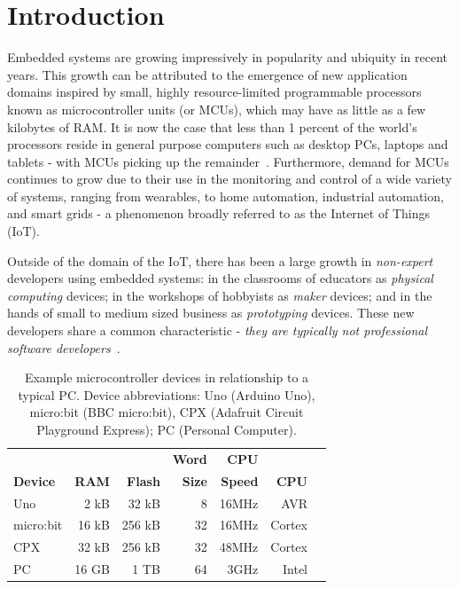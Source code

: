 \section{Introduction}
\label{sec:intro}


Embedded systems are growing impressively in popularity and ubiquity in recent years. This growth can be attributed to the emergence of new application domains inspired by small, highly resource-limited programmable processors known as microcontroller units (or MCUs), which may have as little as a few kilobytes of RAM. It is now the case that less than 1 percent of the world's processors reside in general purpose computers such as desktop PCs, laptops and tablets - with MCUs picking up the remainder~\cite{borriello2000embedded}. Furthermore, demand for MCUs continues to grow due to their use in the monitoring and control of a wide variety of systems, ranging from wearables, to home automation, industrial automation, and smart grids - a phenomenon broadly referred to as the Internet of Things (IoT).

Outside of the domain of the IoT, there has been a large growth in \emph{non-expert} developers using embedded systems: in the classrooms of educators as \emph{physical computing} devices; in the workshops of hobbyists as \emph{maker} devices; and in the hands of small to medium sized business as \emph{prototyping} devices. These new developers share a common characteristic - \emph{they are typically not professional software developers}~\cite{dougherty2012maker,bruce2015make,maksimovic2014raspberry}.

\begin{table}[]
    \centering
    \begin{tabular}{|l|r|r|r|r|r|r|}
    \hline
                           &          &              & \bf{Word}  & \bf{CPU} &            \\
    \bf{Device}            & \bf{RAM} & \bf{Flash}   & \bf{Size}  & \bf{Speed} & \bf{CPU}  \\ \hline
    Uno            & 2 kB       & 32 kB      & 8          & 16MHz & AVR       \\ \hline
    micro:bit          & 16 kB      & 256 kB     & 32         & 16MHz & Cortex     \\ \hline
    CPX           & 32 kB      & 256 kB     & 32         & 48MHz & Cortex    \\ \hline
    PC             & 16 GB      & 1 TB       & 64         & 3GHz & Intel      \\ \hline
    \end{tabular}
    \caption{\label{table:devices}Example microcontroller devices in relationship to a typical PC. Device abbreviations: Uno (Arduino Uno), micro:bit (BBC micro:bit), CPX (Adafruit Circuit Playground Express); PC (Personal Computer).}
\end{table}

